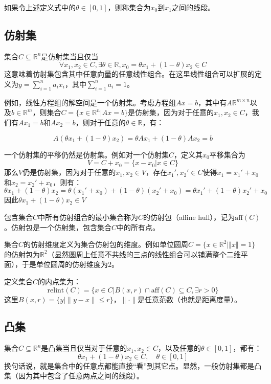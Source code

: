 \documentclass[12pt,a4paper]{book}
\begin{document}
如果令上述定义式中的$\theta \in [0,1]$，则称集合为$x_0$到$x_1$之间的线段。

\subsection{仿射集}
集合$C \subseteq \mathbb{R}^n$是仿射集当且仅当
$$\forall x_1,x_2 \in C, \exists \theta \in \mathbb{R}, x_0 = \theta x_1 + (1-\theta)x_2 \in C$$
这意味着仿射集包含其中任意向量的任意线性组合。在这里线性组合可以扩展的定义为$y = \sum_{i=1}^n a_i x_i$，其中$\sum_{i=1}^n a_i = 1$。

例如，线性方程组的解空间是一个仿射集。考虑方程组$Ax = b$，其中有$A\mathbb{R}^{m\times n}$以及$b\in\mathbb{R}^m$，则集合$C=\{x \in \mathbb{R}^n | Ax = b \}$是仿射集，因为对于任意的$x_1,x_2 \in C$，我们有$Ax_1 = b$和$Ax_2 = b$，则对于任意的$\theta \in \mathbb{R}$，有：

$$A(\theta x_1 + (1 - \theta)x_2) = \theta Ax_1 + (1 - \theta)Ax_2 = b$$

一个仿射集的平移仍然是仿射集。例如对一个仿射集$C$，定义其$x_0$平移集合为
$$V = C + x_0 = \{x-x_0 | x \in C\}$$
那么$V$仍是仿射集，因为对于任意的$x_1,x_2 \in V$，存在$x_1',x_2' \in C$使得$x_1 = x_1' + x_0$和$x_2 = x_2' + x_0$，则有：
$$\theta x_1 + (1 - \theta)x_2 = \theta (x_1' + x_0) + (1 - \theta)(x_2' + x_0) = \theta x_1' + (1 - \theta)x_2' + x_0$$
因此$\theta x_1 + (1 - \theta)x_2 \in V$


包含集合$C$中所有仿射组合的最小集合称为$C$的仿射包（affine hull），记为$\text{aff}(C)$。仿射包是一个仿射集，包含集合$C$中的所有点。

集合$C$的仿射维度定义为集合仿射包的维度。例如单位圆周$C = \{x \in \mathbb{R}^2 | \Vert x \Vert = 1\}$的仿射包为$\mathbb{R}^2$（显然圆周上任意不共线的三点的线性组合可以铺满整个二维平面），于是单位圆周的仿射维度为2。

定义集合$C$的内点集为：
$$\text{relint}(C) = \{x \in C |B(x,r)\cap \text{aff}(C) \subseteq C ,\exists r > 0\}$$
这里$B(x,r) = \{y| \| y-x \|  \leq r\}$，$\|\cdot\|$是任意范数（也就是距离度量）。

\subsection{凸集}

集合$C \subseteq \mathbb{R}^n$是凸集当且仅当对于任意的$x_1,x_2 \in C$，以及任意的$\theta \in [0,1]$，都有：
$$\theta x_1 + (1 - \theta)x_2 \in C,\quad \theta \in [0,1]$$
换句话说，就是集合中的任意点都能直接“看”到其它点。显然，一般仿射集都是凸集（因为其中包含了任意两点之间的线段）。
\end{document}
